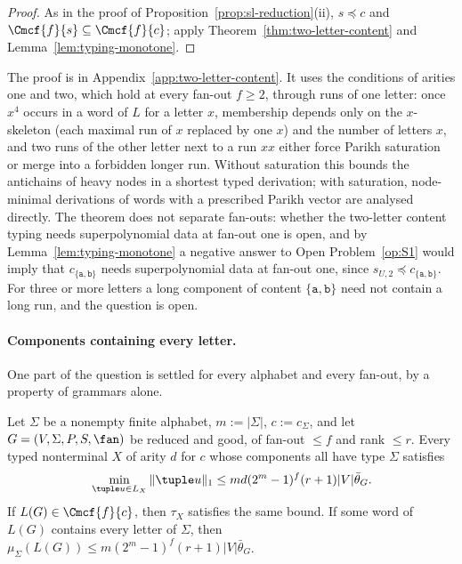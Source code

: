 \begin{proof}
As in the proof of Proposition~\ref{prop:sl-reduction}(ii), $s\preceq c$ and
$\Cmcf{f}{s}\subseteq\Cmcf{f}{c}$; apply Theorem~\ref{thm:two-letter-content} and
Lemma~\ref{lem:typing-monotone}.
\end{proof}

The proof is in Appendix~\ref{app:two-letter-content}.  It uses the
conditions of arities one and two, which hold at every fan-out $f\ge2$, through
runs of one letter: once $x^4$ occurs in a word of
$L$ for a letter $x$, membership depends only on the $x$-skeleton (each maximal
run of $x$ replaced by one $x$) and the number of letters $x$, and two runs of the other letter next to a run $xx$ either
force Parikh saturation or merge into a forbidden longer run.  Without
saturation this bounds the antichains of heavy nodes in a shortest typed
derivation; with saturation, node-minimal derivations of words with a
prescribed Parikh vector are analysed directly.  The theorem does not separate
fan-outs: whether the two-letter content typing needs superpolynomial data at
fan-out one is open, and by Lemma~\ref{lem:typing-monotone} a negative answer
to Open Problem~\ref{op:S1} would imply that $c_{\{\mathtt a,\mathtt b\}}$ needs
superpolynomial data at fan-out one, since $s_{U,2}\preceq c_{\{\mathtt a,\mathtt b\}}$.  For three or more
letters a long component of content $\{\mathtt a,\mathtt b\}$ need not contain a
long run, and the question is open.

\paragraph{Components containing every letter.}
One part of the question is settled for every alphabet and every fan-out, by a
property of grammars alone.

\begin{proposition}
\label{prop:full-content-types}
Let $\Sigma$ be a nonempty finite alphabet, $m:=|\Sigma|$, $c:=c_\Sigma$, and let
$G=(V,\Sigma,P,S,\fan)$ be reduced and good, of fan-out $\le f$ and rank $\le r$.
Every typed nonterminal $X$ of arity $d$ for $c$ whose components all have type
$\Sigma$ satisfies
\[
 \min_{\tuple u\in L_X}\|\tuple u\|_1\le md(2^m-1)^f(r+1)|V|\bar\theta_G .
\]
If $L(G)\in\Cmcf{f}{c}$, then $\tau_X$ satisfies the same bound.  If some word of
$L(G)$ contains every letter of $\Sigma$, then
$\mu_\Sigma(L(G))\le m(2^m-1)^f(r+1)|V|\bar\theta_G$.
\end{proposition}

